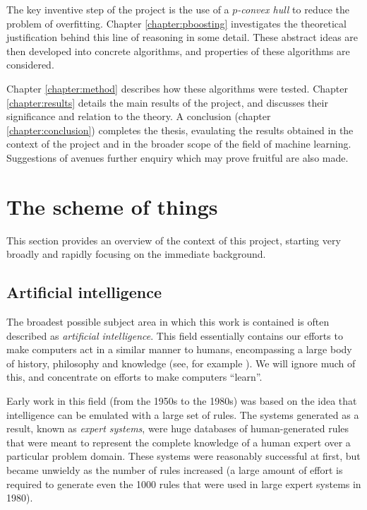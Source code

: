 The key inventive step of the project is the use of a \emph{$p$-convex
hull} to reduce the problem of overfitting.  Chapter
\ref{chapter:pboosting} investigates the theoretical justification
behind this line of reasoning in some detail.  These abstract ideas
are then developed into concrete algorithms, and properties of these
algorithms are considered.

Chapter \ref{chapter:method} describes how these algorithms were
tested.  Chapter \ref{chapter:results} details the main results of the
project, and discusses their significance and relation to the theory.
A conclusion (chapter \ref{chapter:conclusion}) completes the thesis, 
evaulating the results obtained in the context of the project and in
the broader scope of the field of machine learning.  Suggestions of
avenues further enquiry which may prove fruitful are also made.

\section{The scheme of things}

This section provides an overview of the context of this project,
starting very broadly and rapidly focusing on the immediate
background. 


\subsection{Artificial intelligence}

The broadest possible subject area in which this work is contained is
often described as \emph{artificial intelligence}.  This field
essentially contains our efforts to make computers act in a similar
manner to humans, encompassing a large body of history, philosophy and
knowledge (see, for example \cite{Penrose89}).  We will ignore much
of this, and concentrate on efforts to make computers ``learn''.

Early work in this field (from the 1950s to the 1980s) was based on
the idea that intelligence can be emulated with a large set of rules.
The systems generated as a result, known as \emph{expert systems},
were huge databases of human-generated rules that were meant to
represent the complete knowledge of a human expert over a particular
problem domain.  These systems were reasonably successful at first,
but became unwieldy as the number of rules increased (a large amount
of effort is required to generate even the 1000 rules that were used
in large expert systems in 1980). 

